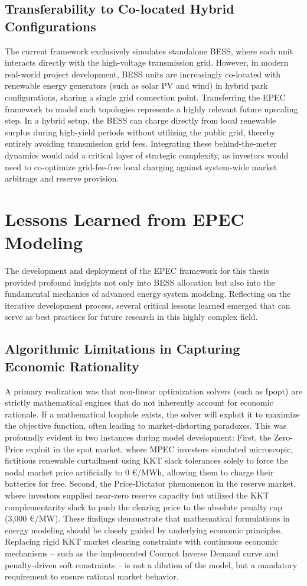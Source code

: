 \subsection{Transferability to Co-located Hybrid Configurations}
The current framework exclusively simulates standalone BESS, where each unit interacts directly with the high-voltage transmission grid. However, in modern real-world project development, BESS units are increasingly co-located with renewable energy generators (such as solar PV and wind) in hybrid park configurations, sharing a single grid connection point. Transferring the EPEC framework to model such topologies represents a highly relevant future upscaling step. In a hybrid setup, the BESS can charge directly from local renewable surplus during high-yield periods without utilizing the public grid, thereby entirely avoiding transmission grid fees. Integrating these behind-the-meter dynamics would add a critical layer of strategic complexity, as investors would need to co-optimize grid-fee-free local charging against system-wide market arbitrage and reserve provision.

\section{Lessons Learned from EPEC Modeling} \label{sec:lessons_learned}

The development and deployment of the EPEC framework for this thesis provided profound insights not only into BESS allocation but also into the fundamental mechanics of advanced energy system modeling. Reflecting on the iterative development process, several critical lessons learned emerged that can serve as best practices for future research in this highly complex field.

\subsection{Algorithmic Limitations in Capturing Economic Rationality}
A primary realization was that non-linear optimization solvers (such as Ipopt) are strictly mathematical engines that do not inherently account for economic rationale. If a mathematical loophole exists, the solver will exploit it to maximize the objective function, often leading to market-distorting paradoxes. This was profoundly evident in two instances during model development: 
First, the Zero-Price exploit in the spot market, where MPEC investors simulated microscopic, fictitious renewable curtailment using KKT slack tolerances solely to force the nodal market price artificially to 0 €/MWh, allowing them to charge their batteries for free. 
Second, the Price-Dictator phenomenon in the reserve market, where investors supplied near-zero reserve capacity but utilized the KKT complementarity slack to push the clearing price to the absolute penalty cap (3,000 €/MW). 
These findings demonstrate that mathematical formulations in energy modeling should be closely guided by underlying economic principles. Replacing rigid KKT market clearing constraints with continuous economic mechanisms -- such as the implemented Cournot Inverse Demand curve and penalty-driven soft constraints -- is not a dilution of the model, but a mandatory requirement to ensure rational market behavior.

